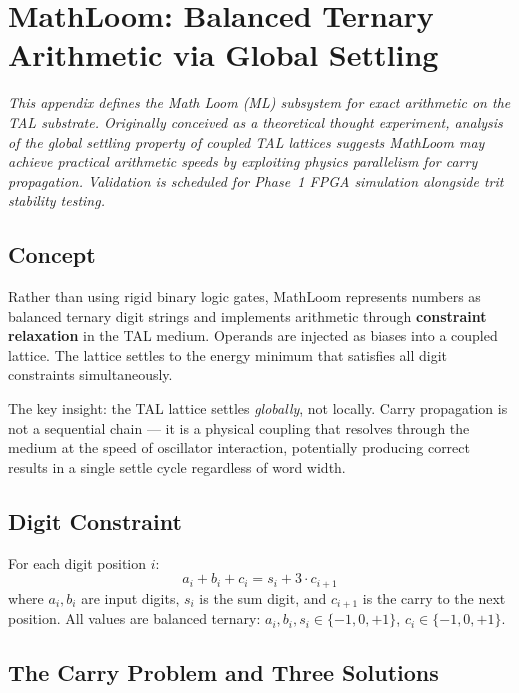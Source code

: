 \documentclass[11pt, a4paper]{report}
\begin{document}

\appendix

\chapter{MathLoom: Balanced Ternary Arithmetic via Global Settling}

\textit{This appendix defines the Math Loom (ML) subsystem for exact
arithmetic on the TAL substrate. Originally conceived as a theoretical
thought experiment, analysis of the global settling property of coupled
TAL lattices suggests MathLoom may achieve practical arithmetic speeds
by exploiting physics parallelism for carry propagation. Validation is
scheduled for Phase~1 FPGA simulation alongside trit stability testing.}

\section{Concept}

Rather than using rigid binary logic gates, MathLoom represents numbers
as balanced ternary digit strings and implements arithmetic through
\textbf{constraint relaxation} in the TAL medium. Operands are injected
as biases into a coupled lattice. The lattice settles to the energy
minimum that satisfies all digit constraints simultaneously.

The key insight: the TAL lattice settles \textit{globally}, not locally.
Carry propagation is not a sequential chain --- it is a physical coupling
that resolves through the medium at the speed of oscillator interaction,
potentially producing correct results in a single settle cycle regardless
of word width.

\section{Digit Constraint}

For each digit position $i$:
\begin{equation}
  a_i + b_i + c_i = s_i + 3 \cdot c_{i+1}
\end{equation}
where $a_i, b_i$ are input digits, $s_i$ is the sum digit, and $c_{i+1}$
is the carry to the next position. All values are balanced ternary:
$a_i, b_i, s_i \in \{-1, 0, +1\}$, $c_i \in \{-1, 0, +1\}$.

\section{The Carry Problem and Three Solutions}
\end{document}
